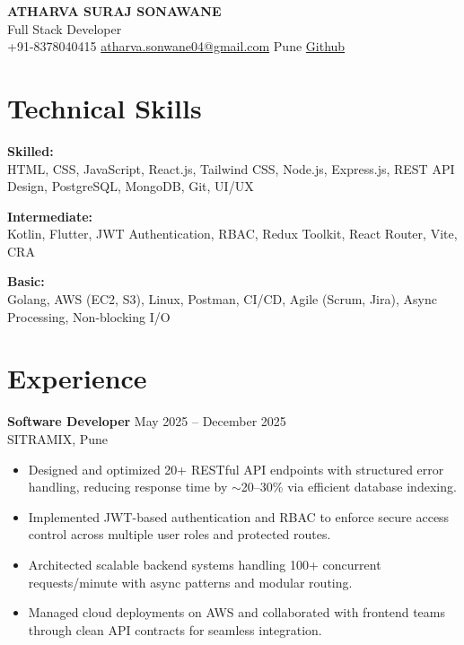\documentclass[a4paper,10pt]{article}
\begin{document}
\pagestyle{empty}

\begin{center}
    {\LARGE \textbf{ATHARVA SURAJ SONAWANE}}\\
    Full Stack Developer\\[4pt]
    +91-8378040415 \quad
    \href{mailto:atharva.sonwane04@gmail.com}{atharva.sonwane04@gmail.com} \quad
    Pune \quad
    \href{https://github.com/}{Github}
\end{center}

\section*{Technical Skills}
\textbf{Skilled:}\\[2pt]
HTML, CSS, JavaScript, React.js, Tailwind CSS, Node.js, Express.js, REST API Design, PostgreSQL, MongoDB, Git, UI/UX

\vspace{4pt}
\textbf{Intermediate:}\\[2pt]
Kotlin, Flutter, JWT Authentication, RBAC, Redux Toolkit, React Router, Vite, CRA

\vspace{4pt}
\textbf{Basic:}\\[2pt]
Golang, AWS (EC2, S3), Linux, Postman, CI/CD, Agile (Scrum, Jira), Async Processing, Non-blocking I/O

\section*{Experience}

\textbf{Software Developer} \hfill May 2025 -- December 2025\\
SITRAMIX, Pune

\begin{itemize}[leftmargin=*]
    \item Designed and optimized 20+ RESTful API endpoints with structured error handling, reducing response time by $\sim$20--30\% via efficient database indexing.
    \item Implemented JWT-based authentication and RBAC to enforce secure access control across multiple user roles and protected routes.
    \item Architected scalable backend systems handling 100+ concurrent requests/minute with async patterns and modular routing.
    \item Managed cloud deployments on AWS and collaborated with frontend teams through clean API contracts for seamless integration.
\end{itemize}
\end{document}

